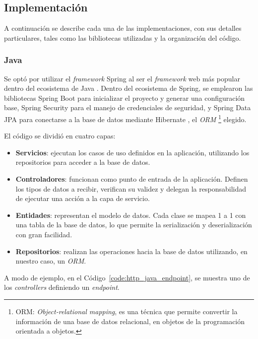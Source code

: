 \documentclass[11pt]{article}
\let\Oldsubsection\subsection
\renewcommand{\subsection}{\FloatBarrier\Oldsubsection}
\let\Oldsubsubsection\subsubsection
\renewcommand{\subsubsection}{\FloatBarrier\Oldsubsubsection}
\newcommand{\english}[1]{\textit{#1}}
\begin{document}
\subsection{Implementación}

A continuación se describe cada una de las implementaciones, con sus detalles particulares, tales como las bibliotecas utilizadas y la organización del código.

\subsubsection{Java}

Se optó por utilizar el \english{framework} Spring \cite{http:java:spring} al ser el \textit{framework} web más popular dentro del ecosistema de Java \cite{http:java}. Dentro del ecosistema de Spring, se emplearon las bibliotecas Spring Boot \cite{http:java:spring-boot}  para inicializar el proyecto y generar una configuración base, Spring Security \cite{http:java:spring-security} para el manejo de credenciales de seguridad, y Spring Data JPA \cite{http:java:spring-data-jpa} para conectarse a la base de datos mediante Hibernate \cite{http:java:hibernate}, el \textit{ORM} \footnote{ORM: \english{Object-relational mapping}, es una técnica que permite convertir la información de una base de datos relacional, en objetos de la programación orientada a objetos.} elegido.

El código se dividió en cuatro capas:

\begin{itemize}
    \item \textbf{Servicios}: ejecutan los casos de uso definidos en la aplicación, utilizando los repositorios para acceder a la base de datos.
    \item \textbf{Controladores}: funcionan como punto de entrada de la aplicación. Definen los tipos de datos a recibir, verifican su validez y delegan la responsabilidad de ejecutar una acción a la capa de servicio.
    \item \textbf{Entidades}: representan el modelo de datos. Cada clase se mapea 1 a 1 con una tabla de la base de datos, lo que permite la serialización y deserialización con gran facilidad.
    \item \textbf{Repositorios}: realizan las operaciones hacia la base de datos utilizando, en nuestro caso, un \textit{ORM}.
\end{itemize}

A modo de ejemplo, en el Código~\ref{code:http_java_endpoint}, se muestra uno de los \english{controllers} definiendo un \english{endpoint}.
\end{document}
